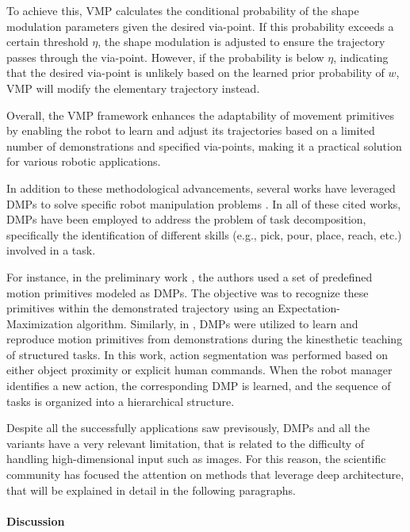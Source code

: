 To achieve this, VMP calculates the conditional probability of the shape modulation parameters given the desired via-point. If this probability exceeds a certain threshold \( \eta \), the shape modulation is adjusted to ensure the trajectory passes through the via-point. However, if the probability is below \( \eta \), indicating that the desired via-point is unlikely based on the learned prior probability of \( w \), VMP will modify the elementary trajectory instead.

Overall, the VMP framework enhances the adaptability of movement primitives by enabling the robot to learn and adjust its trajectories based on a limited number of demonstrations and specified via-points, making it a practical solution for various robotic applications.

In addition to these methodological advancements, several works have leveraged DMPs to solve specific robot manipulation problems \cite{meier2011movement_primitive,caccavale2019kinesthetic,agostini2020manipulation}. In all of these cited works, DMPs have been employed to address the problem of task decomposition, specifically the identification of different skills (e.g., pick, pour, place, reach, etc.) involved in a task. 

For instance, in the preliminary work \cite{meier2011movement_primitive}, the authors used a set of predefined motion primitives modeled as DMPs. The objective was to recognize these primitives within the demonstrated trajectory using an Expectation-Maximization algorithm. Similarly, in \cite{caccavale2019kinesthetic}, DMPs were utilized to learn and reproduce motion primitives from demonstrations during the kinesthetic teaching of structured tasks. In this work, action segmentation was performed based on either object proximity or explicit human commands. When the robot manager identifies a new action, the corresponding DMP is learned, and the sequence of tasks is organized into a hierarchical structure.

Despite all the successfully applications saw previsously, DMPs and all the variants have a very relevant limitation, that is related to the difficulty of handling high-dimensional input such as images. For this reason, the scientific community has focused the attention on methods that leverage deep architecture, that will be explained in detail in the following paragraphs.






\paragraph{Discussion}